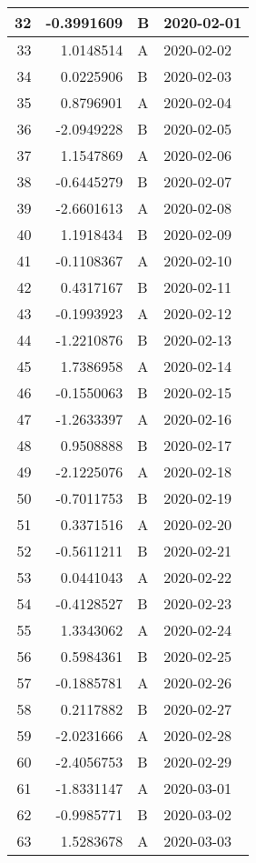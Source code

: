 \begin{tabular}{r|r|l|l}
\hline
32 & -0.3991609 & B & 2020-02-01\\
\hline
33 & 1.0148514 & A & 2020-02-02\\
\hline
34 & 0.0225906 & B & 2020-02-03\\
\hline
35 & 0.8796901 & A & 2020-02-04\\
\hline
36 & -2.0949228 & B & 2020-02-05\\
\hline
37 & 1.1547869 & A & 2020-02-06\\
\hline
38 & -0.6445279 & B & 2020-02-07\\
\hline
39 & -2.6601613 & A & 2020-02-08\\
\hline
40 & 1.1918434 & B & 2020-02-09\\
\hline
41 & -0.1108367 & A & 2020-02-10\\
\hline
42 & 0.4317167 & B & 2020-02-11\\
\hline
43 & -0.1993923 & A & 2020-02-12\\
\hline
44 & -1.2210876 & B & 2020-02-13\\
\hline
45 & 1.7386958 & A & 2020-02-14\\
\hline
46 & -0.1550063 & B & 2020-02-15\\
\hline
47 & -1.2633397 & A & 2020-02-16\\
\hline
48 & 0.9508888 & B & 2020-02-17\\
\hline
49 & -2.1225076 & A & 2020-02-18\\
\hline
50 & -0.7011753 & B & 2020-02-19\\
\hline
51 & 0.3371516 & A & 2020-02-20\\
\hline
52 & -0.5611211 & B & 2020-02-21\\
\hline
53 & 0.0441043 & A & 2020-02-22\\
\hline
54 & -0.4128527 & B & 2020-02-23\\
\hline
55 & 1.3343062 & A & 2020-02-24\\
\hline
56 & 0.5984361 & B & 2020-02-25\\
\hline
57 & -0.1885781 & A & 2020-02-26\\
\hline
58 & 0.2117882 & B & 2020-02-27\\
\hline
59 & -2.0231666 & A & 2020-02-28\\
\hline
60 & -2.4056753 & B & 2020-02-29\\
\hline
61 & -1.8331147 & A & 2020-03-01\\
\hline
62 & -0.9985771 & B & 2020-03-02\\
\hline
63 & 1.5283678 & A & 2020-03-03\\

\end{tabular}
